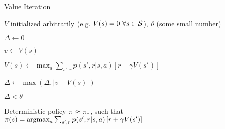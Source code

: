 
\begin{algorithm}
\caption{Value Iteration}
\label{alg:valueiter}

\begin{algorithmic}[0]

	\Require $V$ initialized arbitrarily
		(e.g. $V(s) = 0 \ \forall s \in \States$), %
		$\theta$ (some small number)

	\Repeat

		\State $\Delta \gets 0$


			\State $v \gets V(s)$

			\State $V(s) \gets
				\max_a \sum_{s',r} {
					p(s',r|s,a)\left[ r + \gamma V(s') \right]
				}$

			\State $\Delta \gets \max(\Delta, |v-V(s)|)$

		\EndFor

	\Until $\Delta < \theta$

	\State \Return Deterministic policy $\pi \approx \pi_*$,
		such that \\ \quad
		$\pi(s) = \operatorname*{argmax}_a \sum_{s',r} {
					p(s',r|s,a)\left[ r + \gamma V(s') \right]
				}$

\end{algorithmic}

\end{algorithm}
